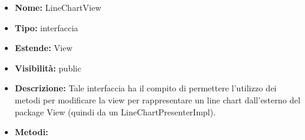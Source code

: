 			
			\begin{itemize}
			\item \textbf{Nome:} LineChartView
			\item \textbf{Tipo:} interfaccia
			
		\item \textbf{Estende:}
		View
			\item \textbf{Visibilità:} public
			\item \textbf{Descrizione:} Tale interfaccia ha il compito di permettere l'utilizzo dei metodi per modificare la view per rappresentare un line chart dall'esterno del package View (quindi da un LineChartPresenterImpl).
			\item \textbf{Metodi:}
				\begin{itemize}
				\setlength{\itemsep}{5pt}
				

\end{itemize}
\end{itemize}
